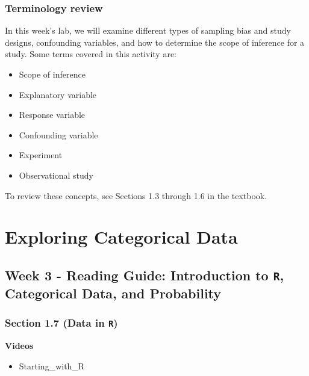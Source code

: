 \documentclass[
]{report}
\providecommand{\tightlist}{%
  \setlength{\itemsep}{0pt}\setlength{\parskip}{0pt}}
\begin{document}
\hypertarget{terminology-review-4}{%
\subsection{Terminology review}\label{terminology-review-4}}

In this week's lab, we will examine different types of sampling bias and study designs, confounding variables, and how to determine the scope of inference for a study. Some terms covered in this activity are:

\begin{itemize}
\item
  Scope of inference
\item
  Explanatory variable
\item
  Response variable
\item
  Confounding variable
\item
  Experiment
\item
  Observational study
\end{itemize}

To review these concepts, see Sections 1.3 through 1.6 in the textbook.

\hypertarget{exploring-categorical-data}{%
\chapter{Exploring Categorical Data}\label{exploring-categorical-data}}

\hypertarget{week-3---reading-guide-introduction-to-r-categorical-data-and-probability}{%
\section{\texorpdfstring{Week 3 - Reading Guide: Introduction to \texttt{R}, Categorical Data, and Probability}{Week 3 - Reading Guide: Introduction to R, Categorical Data, and Probability}}\label{week-3---reading-guide-introduction-to-r-categorical-data-and-probability}}

\hypertarget{section-1.7-data-in-r}{%
\subsection*{\texorpdfstring{Section 1.7 (Data in \texttt{R})}{Section 1.7 (Data in R)}}\label{section-1.7-data-in-r}}

\textbf{Videos}

\begin{itemize}
\tightlist
\item
  Starting\_with\_R
\end{itemize}
\end{document}
